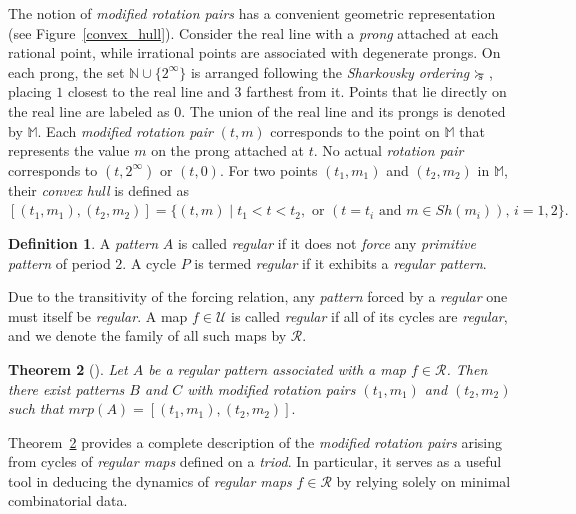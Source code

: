 \documentclass[12pt,reqno]{amsart}
\newtheorem{theorem}{Theorem}[section]
\theoremstyle{definition}
\newtheorem{definition}[theorem]{Definition}
\theoremstyle{remark}
\theoremstyle{assumption}
\numberwithin{equation}{section}
\newcommand{\sha}{\succ\mkern-14mu_s\;}
\begin{document}
The notion of \emph{modified rotation pairs} has a convenient geometric representation (see Figure~\ref{convex_hull}).  
Consider the real line with a \emph{prong} attached at each rational point, while irrational points are associated with degenerate prongs.  
On each prong, the set $\mathbb{N} \cup \{2^{\infty}\}$ is arranged following the \emph{Sharkovsky ordering} $\sha$, placing $1$ closest to the real line and $3$ farthest from it.  
Points that lie directly on the real line are labeled as $0$.  
The union of the real line and its prongs is denoted by $\mathbb{M}$.  
Each \emph{modified rotation pair} $(t, m)$ corresponds to the point on $\mathbb{M}$ that represents the value $m$ on the prong attached at $t$.  
No actual \emph{rotation pair} corresponds to $(t, 2^{\infty})$ or $(t, 0)$.  For two points $(t_1, m_1)$ and $(t_2, m_2)$ in $\mathbb{M}$, their \emph{convex hull} is defined as  
$[(t_1, m_1), (t_2, m_2)] = \{ (t, m) \mid t_1 < t < t_2, \text{ or } (t = t_i \text{ and } m \in Sh(m_i)), \, i = 1, 2 \}.$




\begin{definition}\label{regular:defn}
	A \emph{pattern} $A$ is called \emph{regular} if it does not \emph{force} any \emph{primitive pattern} of period $2$.  
	A cycle $P$ is termed \emph{regular} if it exhibits a \emph{regular pattern}.
\end{definition}

Due to the transitivity of the forcing relation, any \emph{pattern} forced by a \emph{regular} one must itself be \emph{regular}. A map $f \in \mathcal{U}$ is called \emph{regular} if all of its cycles are \emph{regular}, and we denote the family of all such maps by $\mathcal{R}$.
\begin{theorem}[\cite{BM2}]\label{result:1}
	Let $A$ be a regular pattern associated with a map $f \in \mathcal{R}$.
	Then there exist patterns $B$ and $C$ with modified rotation pairs $(t_1 , m_1)$ and $(t_2 , m_2)$ such that
	$mrp(A) = [(t_1, m_1),(t_2, m_2)].$
\end{theorem}
Theorem~\ref{result:1} provides a complete description of the \emph{modified rotation pairs} arising from cycles of \emph{regular maps} defined on a \emph{triod}. In particular, it serves as a useful tool in deducing the dynamics of \emph{regular maps} $f \in \mathcal{R}$ by relying solely on minimal combinatorial data. 
\end{document}
